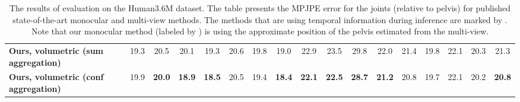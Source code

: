\documentclass[10pt,twocolumn,letterpaper]{article}
\begin{document}
\begin{table*}
{\begin{tabular}{lcccccccccccccccc}
    \textbf{Ours, volumetric (sum aggregation)} &  19.3 & 20.5 & 20.1 & 19.3 & 20.6 & 19.8 & 19.0 & 22.9 & 23.5 & 29.8 & 22.0 & 21.4 & 19.8 & 22.1 & 20.3 & 21.3\\
    \textbf{Ours, volumetric (conf aggregation)} &  19.9 & \textbf{20.0} & \textbf{18.9} & \textbf{18.5} & 20.5 & 19.4 & \textbf{18.4} & \textbf{22.1} & \textbf{22.5} &\textbf{ 28.7} & \textbf{21.2} & 20.8 & 19.7 & 22.1 & 20.2 & \textbf{20.8}\\
    
    \hline
    \bottomrule
   \end{tabular}
  }
 \caption {The results of evaluation on the Human3.6M dataset. The table presents the MPJPE error for the joints (relative to pelvis) for published state-of-the-art monocular and multi-view methods. The methods that are using temporal information during inference are marked by . Note that our monocular method (labeled by ) is using the approximate position of the pelvis estimated from the multi-view.
\label{table_hm36_1}}
\end{table*}
\end{document}
